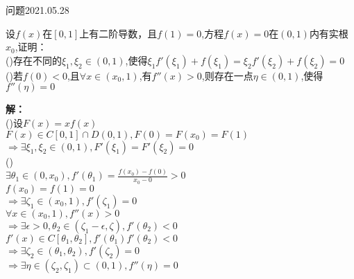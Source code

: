 \begin{mybox}{问题2021.05.28}
	
	\qquad 设$f(x)$在$[0,1]$上有二阶导数，且$f(1)=0$,方程$f(x)=0$在$(0,1)$内有实根$x_{0}$,证明：\\
	\qquad(\uppercase\expandafter{})存在不同的$\xi_{1},\xi_{2}\in(0,1)$,使得$\xi_{1}f'(\xi_{1})+f(\xi_{1})=\xi_{2}f'(\xi_{2})+f(\xi_{2})=0$\\
	\qquad(\uppercase\expandafter{})若$f(0)<0$,且$\forall x\in(x_{0},1)$,有$f''(x)>0$,则存在一点$\eta\in(0,1)$,使得$f''(\eta)=0$
\end{mybox}
\noindent
\textbf{解：}\\
(\uppercase\expandafter{})设$F(x)=xf(x)$\\
$F(x)\in C[0,1]\cap D(0,1),F(0)=F(x_{0})=F(1)$\\
$\Rightarrow \exists \xi_{1},\xi_{2} \in(0,1) ,F'(\xi_{1})=F'(\xi_{2})=0$\\
\noindent
(\uppercase\expandafter{})\\
$\exists \theta_{1}\in(0,x_{0}),f'(\theta_{1})=\frac{f(x_{0})-f(0)}{x_{0}-0}	>0$\\
\noindent
$f(x_{0})=f(1)=0$\\
$\Rightarrow \exists\zeta_{1}\in(x_{0},1),f'(\zeta_{1})=0$\\
$\forall x\in(x_{0},1),f''(x)>0$\\
$\Rightarrow \exists \epsilon>0, \theta_{2}\in(\zeta_{1}-\epsilon,\zeta),f'(\theta_{2})<0$\\
$f'(x)\in C[\theta_{1},\theta_{2}],f'(\theta_{1})f'(\theta_{2})<0$\\
$\Rightarrow \exists \zeta_{2}\in(\theta_{1},\theta_{2}),f'(\zeta_{2})=0$\\
$\Rightarrow \exists \eta \in(\zeta_{2},\zeta_{1})\subset (0,1),f''(\eta)=0$